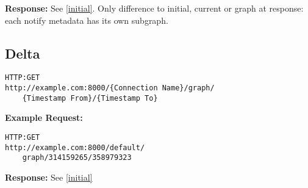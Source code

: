 \textbf{Response:}
See \ref{initial}. Only difference to initial, current or graph at response: each notify metadata has its own subgraph.


\subsection{Delta}
\begin{lstlisting}
HTTP:GET
http://example.com:8000/{Connection Name}/graph/
	{Timestamp From}/{Timestamp To}
\end{lstlisting}

\begin{minipage}{\linewidth}
\textbf{Example Request:}
\begin{lstlisting}
HTTP:GET
http://example.com:8000/default/
	graph/314159265/358979323
\end{lstlisting}
\end{minipage}

\begin{minipage}{\linewidth}
\textbf{Response:}
See \ref{initial}
\end{minipage}